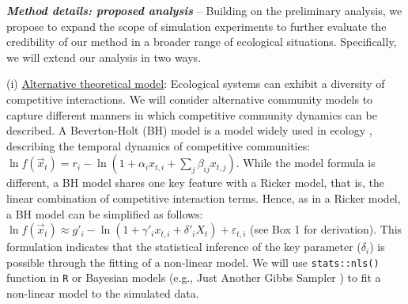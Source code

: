 \documentclass[12pt, class=article, crop=false]{standalone}
\begin{document}
\textbf{\textit{Method details: proposed analysis}} -- 
Building on the preliminary analysis, we propose to expand the scope of simulation experiments to further evaluate the credibility of our method in a broader range of ecological situations.
Specifically, we will extend our analysis in two ways.

(i) \ul{Alternative theoretical model}:
Ecological systems can exhibit a diversity of competitive interactions.
We will consider alternative community models to capture different manners in which competitive community dynamics can be described. 
A Beverton-Holt (BH) model is a model widely used in ecology \citep{otto_biologists_2011}, describing the temporal dynamics of competitive communities: $\ln f(\overset{\rightarrow}{x}_{t}) = r_i - \ln(1 + \alpha_i x_{t,i} + \sum_j \beta_{ij} x_{t,j})$. 
While the model formula is different, a BH model shares one key feature with a Ricker model, that is, the linear combination of competitive interaction terms.
Hence, as in a Ricker model, a BH model can be simplified as follows: $\ln f(\overset{\rightarrow}{x}_{t}) \approx g'_{i} - \ln(1 + \gamma'_i x_{t,i} + \delta'_i X_t) + \varepsilon_{t,i}$ (see Box 1 for derivation).
This formulation indicates that the statistical inference of the key parameter ($\delta_i$) is possible through the fitting of a non-linear model.
We will use \texttt{stats::nls()} function in \texttt{R} or Bayesian models (e.g., Just Another Gibbs Sampler \citep{plummer_jags_2003}) to fit a non-linear model to the simulated data.
\end{document}
